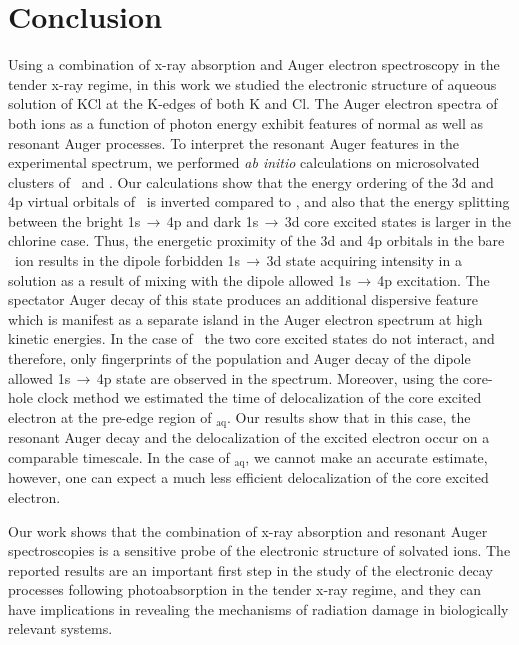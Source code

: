 \section{Conclusion}\label{sec:concl}

Using a combination of x-ray absorption and Auger electron spectroscopy in the tender x-ray regime, in this work we studied the electronic structure of aqueous solution of KCl at the K-edges of both K and Cl. The Auger electron spectra of both ions as a function of photon energy exhibit features of normal as well as resonant Auger processes. To interpret the resonant Auger features in the experimental spectrum, we performed {\it ab initio} calculations on microsolvated clusters of \ki~and \cli. Our calculations show that the energy ordering of the 3d and 4p virtual orbitals of \cli~is inverted compared to \ki, and also that the energy splitting between the bright 1s$\,\rightarrow\,$4p and dark 1s$\,\rightarrow\,$3d core excited states is larger in the chlorine case. Thus, the energetic proximity of the 3d and 4p orbitals in the bare \ki~ion results in the dipole forbidden 1s$\,\rightarrow\,$3d state acquiring intensity in a solution as a result of mixing with the dipole allowed 1s$\,\rightarrow\,$4p excitation. The spectator Auger decay of this state produces an additional dispersive feature which is manifest as a separate island in the Auger electron spectrum at high kinetic energies. In the case of \cli~the two core excited states do not interact, and therefore, only fingerprints of the population and Auger decay of the dipole allowed 1s$\,\rightarrow\,$4p state are observed in the spectrum. {\color{red}Moreover, using the core-hole clock method we estimated the time of delocalization of the core excited electron at the pre-edge region of \cli$_{\text{aq}}$. Our results show that in this case, the resonant Auger decay and the delocalization of the excited electron occur on a comparable timescale. In the case of \ki$_{\text{aq}}$, we cannot make an accurate estimate, however, one can expect a much less efficient delocalization of the core excited electron.}


Our work shows that the combination of x-ray absorption and resonant Auger spectroscopies is a sensitive probe of the electronic structure of solvated ions. The reported results are an important first step in the study of the electronic decay processes following photoabsorption in the tender x-ray regime, and they can have implications in revealing the mechanisms of radiation damage in biologically relevant systems.